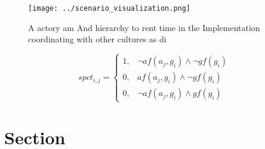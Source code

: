 \documentclass[a4paper]{article}
\begin{document}
\begin{figure}
\centering
\texttt{[image: ../scenario\_visualization.png]}
\caption{A actory am And hierarchy to rent time in the Implementation coordinating with other cultures as di
}
\end{figure}
 
\begin{equation}
spct_{i,j} =
\begin{cases}
1, & \text{$\neg af(a_j,g_i) \wedge \neg gf(g_i)$}\\
0, & \text{$af(a_j,g_i) \wedge \neg gf(g_i)$}\\
0, & \text{$\neg af(a_j,g_i) \wedge gf(g_i)$}
\end{cases}
\end{equation}

\section{Section}
\end{document}
